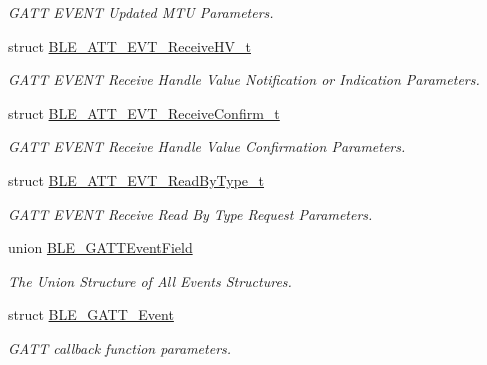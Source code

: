 \begin{DoxyCompactItemize}
\begin{DoxyCompactList}\small\item\em G\+A\+TT E\+V\+E\+NT Updated M\+TU Parameters. \end{DoxyCompactList}\item 
struct \hyperlink{struct_b_l_e___a_t_t___e_v_t___receive_h_v__t}{B\+L\+E\+\_\+\+A\+T\+T\+\_\+\+E\+V\+T\+\_\+\+Receive\+H\+V\+\_\+t}
\begin{DoxyCompactList}\small\item\em G\+A\+TT E\+V\+E\+NT Receive Handle Value Notification or Indication Parameters. \end{DoxyCompactList}\item 
struct \hyperlink{struct_b_l_e___a_t_t___e_v_t___receive_confirm__t}{B\+L\+E\+\_\+\+A\+T\+T\+\_\+\+E\+V\+T\+\_\+\+Receive\+Confirm\+\_\+t}
\begin{DoxyCompactList}\small\item\em G\+A\+TT E\+V\+E\+NT Receive Handle Value Confirmation Parameters. \end{DoxyCompactList}\item 
struct \hyperlink{struct_b_l_e___a_t_t___e_v_t___read_by_type__t}{B\+L\+E\+\_\+\+A\+T\+T\+\_\+\+E\+V\+T\+\_\+\+Read\+By\+Type\+\_\+t}
\begin{DoxyCompactList}\small\item\em G\+A\+TT E\+V\+E\+NT Receive Read By Type Request Parameters. \end{DoxyCompactList}\item 
union \hyperlink{union_b_l_e___g_a_t_t_event_field}{B\+L\+E\+\_\+\+G\+A\+T\+T\+Event\+Field}
\begin{DoxyCompactList}\small\item\em The Union Structure of All Events Structures. \end{DoxyCompactList}\item 
struct \hyperlink{struct_b_l_e___g_a_t_t___event}{B\+L\+E\+\_\+\+G\+A\+T\+T\+\_\+\+Event}
\begin{DoxyCompactList}\small\item\em G\+A\+TT callback function parameters. \end{DoxyCompactList}\end{DoxyCompactItemize}
